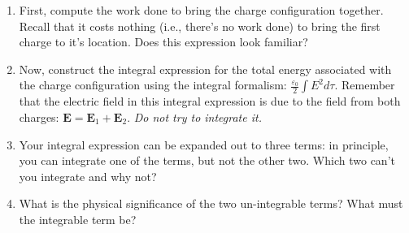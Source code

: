 \documentclass[11pt]{article}
\def\tightlist{}
\begin{document}
\begin{enumerate}
\def\labelenumi{\arabic{enumi}.}
\tightlist
\item
  First, compute the work done to bring the charge configuration
  together. Recall that it costs nothing (i.e., there's no work done) to
  bring the first charge to it's location. Does this expression look
  familiar?
\item
  Now, construct the integral expression for the total energy associated
  with the charge configuration using the integral formalism:
  \(\frac{\varepsilon_0}{2} \int E^2 d\tau\). Remember that the electric
  field in this integral expression is due to the field from both
  charges: \(\mathbf{E} = \mathbf{E}_1 + \mathbf{E}_2\). \emph{Do not
  try to integrate it.}
\item
  Your integral expression can be expanded out to three terms: in
  principle, you can integrate one of the terms, but not the other two.
  Which two can't you integrate and why not?
\item
  What is the physical significance of the two un-integrable terms? What
  must the integrable term be?
\end{enumerate}
\end{document}
